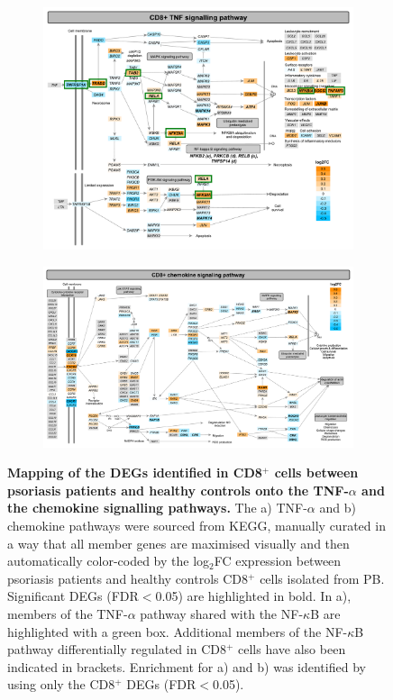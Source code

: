 \begin{figure}[htbp]
\centering
\begin{subfigure}{0.5\textwidth}
\centering
\includegraphics[width=\textwidth]{./Results2/pdfs/PS_CTL_CD8_all_TNF_pathway}
\caption{\textbf{}}
\end{subfigure}
\begin{subfigure}{0.5\textwidth}
\centering
\includegraphics[width=\textwidth]{./Results2/pdfs/PS_CTL_CD8_all_chemokine_pathway}
\caption{\textbf{}}
\end{subfigure}
\caption[Mapping of the DEGs identified in CD8$^+$ cells between psoriasis patients and healthy controls onto the TNF-$\alpha$ and the chemokine signalling pathways.]{\textbf{Mapping of the DEGs identified in CD8$^+$ cells between psoriasis patients and healthy controls onto the TNF-$\alpha$ and the chemokine signalling pathways.} The a) TNF-$\alpha$ and b) chemokine pathways were sourced from KEGG, manually curated in a way that all member genes are maximised visually and then automatically color-coded by the log$_2$FC expression between psoriasis patients and healthy controls CD8$^+$ cells isolated from PB. Significant DEGs (FDR$<$0.05) are highlighted in bold. In a), members of the TNF-$\alpha$ pathway shared with the NF-$\kappa$B are highlighted with a green box. Additional members of the NF-$\kappa$B pathway differentially regulated in CD8$^+$ cells have also been indicated in brackets. Enrichment for a) and b) was identified by using only the CD8$^+$ DEGs (FDR$<$0.05).}

\end{figure}
